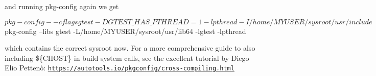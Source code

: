 

and running {\ttfamily pkg-\/config} again we get


\begin{DoxyCode}
$ pkg-config --cflags gtest
-DGTEST\_HAS\_PTHREAD=1 -lpthread -I/home/MYUSER/sysroot/usr/include
$ pkg-config --libs gtest
-L/home/MYUSER/sysroot/usr/lib64 -lgtest -lpthread
\end{DoxyCode}


which contains the correct sysroot now. For a more comprehensive guide to also including {\ttfamily \$\{C\+H\+O\+ST\}} in build system calls, see the excellent tutorial by Diego Elio Pettenò\+: \href{https://autotools.io/pkgconfig/cross-compiling.html}{\tt https\+://autotools.\+io/pkgconfig/cross-\/compiling.\+html} 